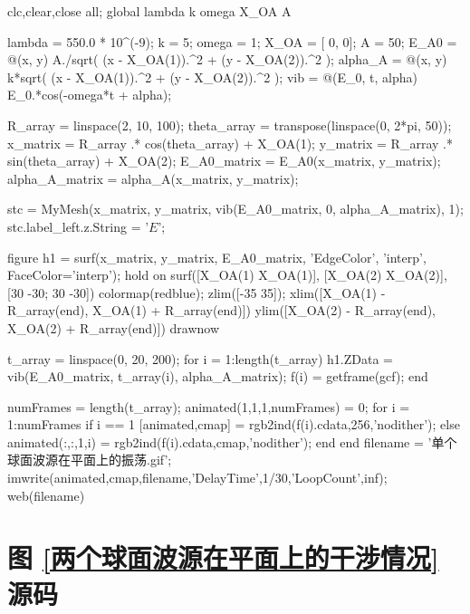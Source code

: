 \documentclass[UTF8]{report}
\theoremstyle{MyLineTheoremStyle} %
\theoremstyle{MyBlockTheoremStyle} %
\theoremstyle{MySubsubsectionStyle} %
\begin{document}
\begin{matlablisting}
clc,clear,close all;
global lambda k omega X_OA A

lambda = 550.0 * 10^(-9); %
k = 5;      %
omega = 1;  %
X_OA = [ 0, 0];  %
A = 50; %
E_A0 = @(x, y) A./sqrt( (x - X_OA(1)).^2 + (y - X_OA(2)).^2 ); %
alpha_A = @(x, y) k*sqrt( (x - X_OA(1)).^2 + (y - X_OA(2)).^2 );
vib = @(E_0, t, alpha) E_0.*cos(-omega*t + alpha); %

R_array = linspace(2, 10, 100);
theta_array = transpose(linspace(0, 2*pi, 50));
x_matrix = R_array .* cos(theta_array) + X_OA(1);
y_matrix = R_array .* sin(theta_array) + X_OA(2);
E_A0_matrix = E_A0(x_matrix, y_matrix);
alpha_A_matrix = alpha_A(x_matrix, y_matrix);

stc = MyMesh(x_matrix, y_matrix, vib(E_A0_matrix, 0, alpha_A_matrix), 1);
stc.label_left.z.String = '$E$';


figure 
h1 = surf(x_matrix, y_matrix, E_A0_matrix, 'EdgeColor', 'interp', FaceColor='interp');
hold on
surf([X_OA(1) X_OA(1)], [X_OA(2) X_OA(2)], [30 -30; 30 -30])
colormap(redblue);
zlim([-35 35]);
xlim([X_OA(1) - R_array(end), X_OA(1) + R_array(end)])
ylim([X_OA(2) - R_array(end), X_OA(2) + R_array(end)])
drawnow

t_array = linspace(0, 20, 200);
for i = 1:length(t_array)
    h1.ZData = vib(E_A0_matrix, t_array(i), alpha_A_matrix);
    f(i) = getframe(gcf);
end

numFrames = length(t_array);
animated(1,1,1,numFrames) = 0;
for i = 1:numFrames
    if i == 1
        [animated,cmap] = rgb2ind(f(i).cdata,256,'nodither');
    else
        animated(:,:,1,i) = rgb2ind(f(i).cdata,cmap,'nodither');
    end
end
filename = '单个球面波源在平面上的振荡.gif';
imwrite(animated,cmap,filename,'DelayTime',1/30,'LoopCount',inf);
web(filename)
\end{matlablisting}

\section{图 \ref{两个球面波源在平面上的干涉情况} 源码}
\label{两个球面波源在平面上的干涉情况 源码}
\end{document}
